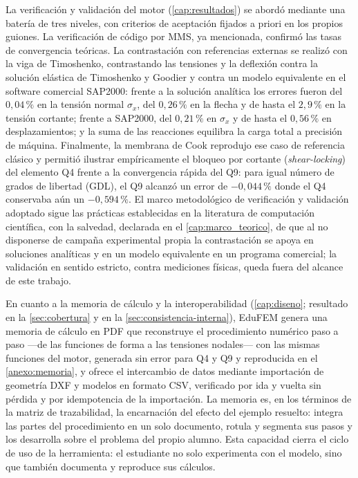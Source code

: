 La verificación y validación del motor (\autoref{cap:resultados}) se abordó mediante una batería de tres niveles, con criterios de aceptación fijados a priori en los propios guiones. La verificación de código por MMS, ya mencionada, confirmó las tasas de convergencia teóricas. La contrastación con referencias externas se realizó con la viga de Timoshenko, contrastando las tensiones y la deflexión contra la solución elástica de Timoshenko y Goodier y contra un modelo equivalente en el software comercial SAP2000: frente a la solución analítica los errores fueron del $0{,}04\,\%$ en la tensión normal $\sigma_x$, del $0{,}26\,\%$ en la flecha y de hasta el $2{,}9\,\%$ en la tensión cortante; frente a SAP2000, del $0{,}21\,\%$ en $\sigma_x$ y de hasta el $0{,}56\,\%$ en desplazamientos; y la suma de las reacciones equilibra la carga total a precisión de máquina. Finalmente, la membrana de Cook reprodujo ese caso de referencia clásico y permitió ilustrar empíricamente el bloqueo por cortante (\emph{shear-locking}) del elemento Q4 frente a la convergencia rápida del Q9: para igual número de grados de libertad (GDL), el Q9 alcanzó un error de $-0{,}044\,\%$ donde el Q4 conservaba aún un $-0{,}594\,\%$. El marco metodológico de verificación y validación adoptado sigue las prácticas establecidas en la literatura de computación científica, con la salvedad, declarada en el \autoref{cap:marco_teorico}, de que al no disponerse de campaña experimental propia la contrastación se apoya en soluciones analíticas y en un modelo equivalente en un programa comercial; la validación en sentido estricto, contra mediciones físicas, queda fuera del alcance de este trabajo.

En cuanto a la memoria de cálculo y la interoperabilidad (\autoref{cap:diseno}; resultado en la \autoref{sec:cobertura} y en la \autoref{sec:consistencia-interna}), EduFEM genera una memoria de cálculo en PDF que reconstruye el procedimiento numérico paso a paso —de las funciones de forma a las tensiones nodales— con las mismas funciones del motor, generada sin error para Q4 y Q9 y reproducida en el \autoref{anexo:memoria}, y ofrece el intercambio de datos mediante importación de geometría DXF y modelos en formato CSV, verificado por ida y vuelta sin pérdida y por idempotencia de la importación. La memoria es, en los términos de la matriz de trazabilidad, la encarnación del efecto del ejemplo resuelto: integra las partes del procedimiento en un solo documento, rotula y segmenta sus pasos y los desarrolla sobre el problema del propio alumno. Esta capacidad cierra el ciclo de uso de la herramienta: el estudiante no solo experimenta con el modelo, sino que también documenta y reproduce sus cálculos.

